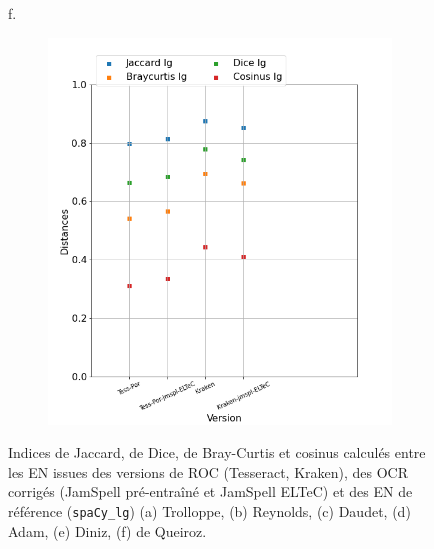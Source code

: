 \begin{figure}
\begin{minipage}{7cm}
\begin{subfigure}{0.99\textwidth}
  \vspace{-0.3cm}
  \label{fig:Diniz_DIST_KRAKENBASE_LG}
  \end{subfigure}
  \end{minipage} 
\begin{minipage}{7cm}
f.\
  \begin{subfigure}{0.99\textwidth}
  \includegraphics[height=.99\textwidth]{IMAGES/ELTeC_DISTANCES_spaCy3.5.1/DE-QUEIROS-CRIME-graph-dist-spaCy3.5.1-lg.png} 
  \vspace{-0.3cm}
  \label{fig:DE-QUEIROS-CRIME_DIST_KRAKENBASE_LG}
  \end{subfigure}
  \end{minipage}


\caption{Indices de Jaccard, de Dice, de Bray-Curtis et cosinus calculés entre les EN issues des versions de ROC (Tesseract, Kraken), des OCR corrigés (JamSpell pré-entraîné et JamSpell ELTeC) et des EN de référence (\texttt{spaCy\_lg}) (a) Trolloppe, (b) Reynolds, (c) Daudet, (d) Adam, (e) Diniz, (f) de Queiroz.}
\label{fig:distances-EN}
\end{figure}


